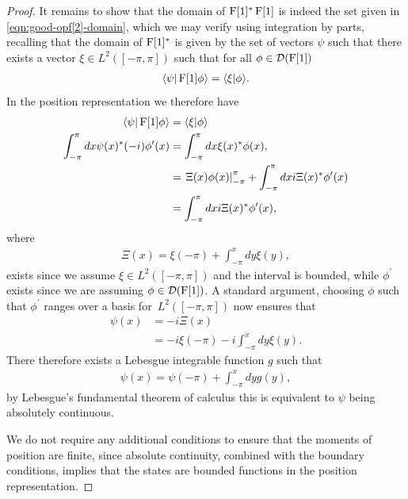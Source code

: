 \begin{proof}
It remains to show that the domain of $\operatorname{F}[1]^*\operatorname{F}[1]$ is indeed the set given in \eqref{eqn:good-opf[2]-domain}, which we may verify using integration by parts, recalling that the domain of $\operatorname{F}[1]^*$ is given by the set of vectors $\psi$ such that there exists a vector $\xi\in L^2([-\pi,\pi])$ such that for all $\phi\in\mathcal{D}(\operatorname{F}[1])$
\begin{align}
  \langle \psi|\operatorname{F}[1]\phi\rangle = \langle \xi|\phi\rangle.
\end{align}
In the position representation we therefore have
\begin{align}
  \langle \psi|\operatorname{F}[1]\phi\rangle &= \langle \xi|\phi\rangle\\
  \int_{-\pi}^{\pi}dx\psi(x)^*(-i)\phi^\prime(x) &= \int_{-\pi}^{\pi}dx \xi(x)^* \phi(x), \\
                             &= \left.\Xi(x)\phi(x)\right\vert_{-\pi}^{\pi} + \int_{-\pi}^{\pi}dx i\Xi(x)^* \phi^\prime(x)\\
                             &= \int_{-\pi}^{\pi}dx i\Xi(x)^* \phi^\prime(x), 
\end{align}
where
\begin{align}
  \Xi(x) = \xi(-\pi)+\int_{-\pi}^{x}dy\xi(y),
\end{align}
exists since we assume $\xi\in L^2([-\pi,\pi])$ and the interval is bounded, while $\phi^\prime$ exists since we are assuming $\phi\in\mathcal{D}(\operatorname{F}[1])$. A standard argument, choosing $\phi$ such that $\phi^\prime$ ranges over a basis for~$L^2([-\pi,\pi])$ now ensures that
\begin{align}
  \psi(x) &= -i\Xi(x)\\
          &= -i\xi(-\pi)-i\int_{-\pi}^{x}dy\xi(y).
\end{align}
There therefore exists a Lebesgue integrable function $g$ such that 
\begin{align}
  \psi(x) = \psi(-\pi) + \int_{-\pi}^xdy g(y),
\end{align}
by Lebesgue's fundamental theorem of calculus this is equivalent to $\psi$ being absolutely continuous.

We do not require any additional conditions to ensure that the moments of position are finite, since absolute continuity, combined with the boundary conditions, implies that the states are bounded functions in the position representation.
\end{proof}

